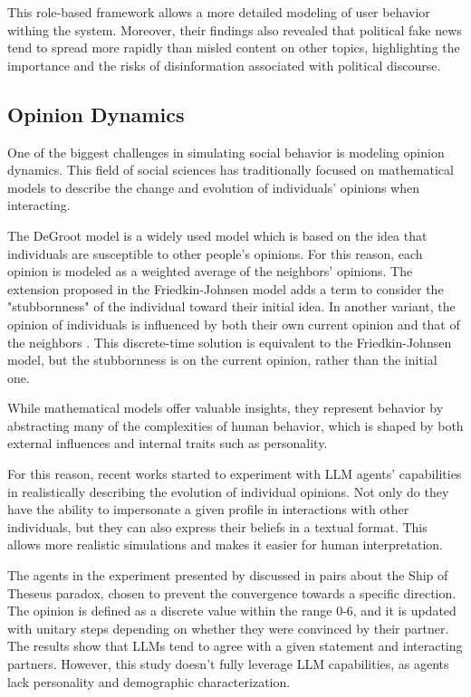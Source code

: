This role-based framework allows a more detailed modeling of user behavior withing the system.
Moreover, their findings also revealed that political fake news tend to spread more rapidly than misled content on other topics, highlighting the importance and the risks of disinformation associated with political discourse.



\subsection{Opinion Dynamics}
One of the biggest challenges in simulating social behavior is modeling opinion dynamics. This field of social sciences has traditionally focused on mathematical models to describe the change and evolution of individuals' opinions when interacting.
\medskip

The DeGroot model \cite{Degroot1974} is a widely used model which is based on the idea that individuals are susceptible to other people's opinions. For this reason, each opinion is modeled as a weighted average of the neighbors' opinions.
The extension proposed in the Friedkin-Johnsen model \cite{friedkin_1990} adds a term to consider the "stubbornness" of the individual toward their initial idea. 
In another variant, the opinion of individuals is influenced by both their own current opinion and that of the neighbors \cite{Ye2018Opinion, Liu_2018}. This discrete-time solution is equivalent to the Friedkin-Johnsen model, but the stubbornness is on the current opinion, rather than the initial one.

\medskip
While mathematical models offer valuable insights, they represent behavior by abstracting many of the complexities of human behavior, which is shaped by both external influences and internal traits such as personality.

For this reason, recent works started to experiment with LLM agents' capabilities in realistically describing the evolution of individual opinions. 
Not only do they have the ability to impersonate a given profile in interactions with other individuals, but they can also express their beliefs in a textual format.
This allows more realistic simulations and makes it easier for human interpretation.

The agents in the experiment presented by \citet{cau2025languagedrivenopiniondynamicsagentbased} discussed in pairs about the Ship of Theseus paradox, chosen to prevent the convergence towards a specific direction.
The opinion is defined as a discrete value within the range 0-6, and it is updated with unitary steps depending on whether they were convinced by their partner.
The results show that LLMs tend to agree with a given statement and interacting partners. However, this study doesn't fully leverage LLM capabilities, as agents lack personality and demographic characterization.


